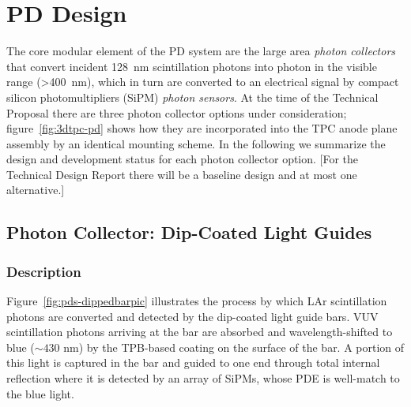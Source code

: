 \section{PD Design}
\label{sec:fdsp-pd-design}


The core modular element of the PD system are the large area {\it photon collectors} that convert incident 128~nm scintillation photons into photon in the visible range (>400~nm), which in turn are converted to an electrical signal by compact silicon photomultipliers (SiPM) {\it photon sensors}. At the time of the Technical Proposal there are three photon collector options under consideration; figure~\ref{fig:3dtpc-pd} shows how they are incorporated into the TPC anode plane assembly by an identical mounting scheme. In the following we summarize the design and development status for each photon collector option. 
[For the Technical Design Report there will be a baseline design and at most one alternative.]



\subsection{Photon Collector: Dip-Coated Light Guides}
\label{ssec:fdsp-pd-pc-bar1}


\subsubsection{Description}

Figure~\ref{fig:pds-dippedbarpic} illustrates the process by which LAr scintillation photons are converted and detected by the dip-coated light guide bars.  VUV scintillation photons arriving at the bar are absorbed and wavelength-shifted to blue ($\sim430$ nm) by the TPB-based coating on the surface of the bar.  A portion of this light is captured in the bar and guided to one end through total internal reflection where it is detected by an array of SiPMs, whose PDE is well-match to the blue light.


